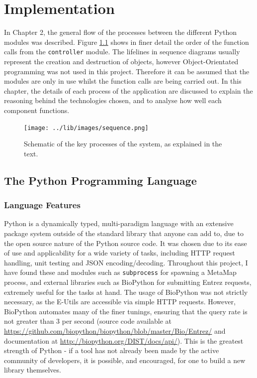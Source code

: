 \documentclass[Report.tex]{subfiles}
\begin{document}
\chapter{Implementation}
In Chapter 2, the general flow of the processes between the different Python modules was described. Figure \ref{fig:sequence} shows in finer detail the order of the function calls from the \texttt{controller} module. The lifelines in sequence diagrams usually represent the creation and destruction of objects, however Object-Orientated programming was not used in this project. Therefore it can be assumed that the modules are only in use whilst the function calls are being carried out. In this chapter, the details of each process of the application are discussed to explain the reasoning behind the technologies chosen, and to analyse how well each component functions.

\begin{figure}[h!]
\texttt{[image: ../lib/images/sequence.png]}
\caption{Schematic of the key processes of the system, as explained in the text.}
\label{fig:sequence}
\end{figure}

\section{The Python Programming Language}
\subsection{Language Features}
Python is a dynamically typed, multi-paradigm language with an extensive package system outside of the standard library that anyone can add to, due to the open source nature of the Python source code\cite{pythonabout}. It was chosen due to its ease of use and applicability for a wide variety of tasks, including HTTP request handling, unit testing and JSON encoding/decoding. Throughout this project, I have found these and modules such as \texttt{subprocess} for spawning a MetaMap process, and external libraries such as BioPython for submitting Entrez requests, extremely useful for the tasks at hand. The usage of BioPython was not strictly necessary, as the E-Utils are accessible via simple HTTP requests. However, BioPython automates many of the finer tunings, ensuring that the query rate is not greater than 3 per second (source code available at \url{https://github.com/biopython/biopython/blob/master/Bio/Entrez/} and documentation at \url{http://biopython.org/DIST/docs/api/}). This is the greatest strength of Python - if a tool has not already been made by the active community of developers, it is possible, and encouraged, for one to build a new library themselves.
\end{document}
